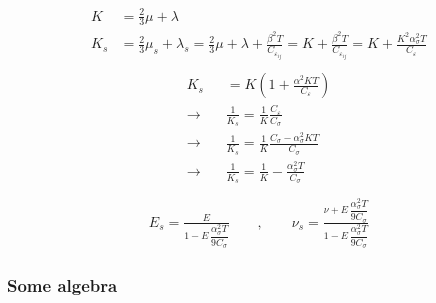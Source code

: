 \documentclass[letterpaper,10pt,english]{jupyterBook}
\begin{document}
\begin{equation*}
\begin{split}\begin{aligned}
  K   & = \frac{2}{3} \mu + \lambda \\
  K_s & = \frac{2}{3} \mu_s + \lambda_s = \frac{2}{3} \mu + \lambda + \frac{\beta^2 T}{C_{\varepsilon_{ij}}} = K + \frac{\beta^2 T}{C_{\varepsilon_{ij}}} = K + \frac{K^2 \alpha^2_{\sigma} T}{C_{\varepsilon}}
\end{aligned}\end{split}
\end{equation*}\begin{equation*}
\begin{split}\begin{aligned}
  K_s 
  & = K \left( 1 + \frac{\alpha^2 K T}{C_{\varepsilon}} \right) \\
 \rightarrow \quad  & \frac{1}{K_s} = \frac{1}{K} \frac{C_{\varepsilon}}{C_{\sigma}} \\
 \rightarrow \quad  & \frac{1}{K_s} = \frac{1}{K} \frac{C_{\sigma} - \alpha_{\sigma}^2 K T}{C_{\sigma}} \\
 \rightarrow \quad  & \frac{1}{K_s} = \frac{1}{K} - \frac{\alpha_{\sigma}^2 T}{C_{\sigma}} \\
\end{aligned}\end{split}
\end{equation*}
\sphinxAtStartPar
{}
\begin{equation*}
\begin{split}
 E_s = \frac{E}{1 - E \, \dfrac{\alpha^2_\sigma T}{9 C_\sigma}}
 \qquad , \qquad
 \nu_s = \frac{\nu + E \, \dfrac{\alpha^2_\sigma T}{9 C_\sigma}}{1 - E \, \dfrac{\alpha^2_\sigma T}{9 C_\sigma}}
\end{split}
\end{equation*}\subsubsection*{Some algebra}
\end{document}
